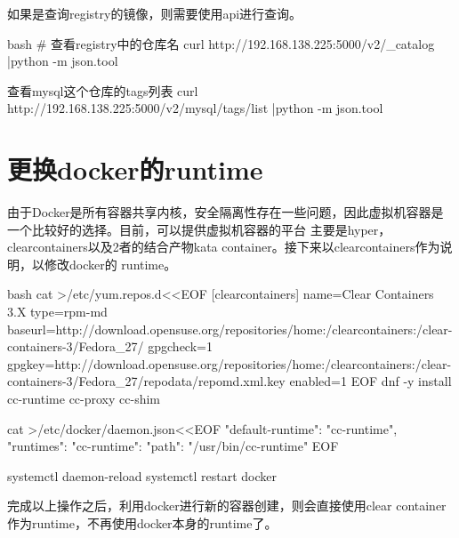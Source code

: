 如果是查询registry的镜像，则需要使用api进行查询。
\begin{code-block}{bash}
# 查看registry中的仓库名
curl http://192.168.138.225:5000/v2/_catalog |python -m json.tool

查看mysql这个仓库的tags列表
curl http://192.168.138.225:5000/v2/mysql/tags/list |python -m json.tool
\end{code-block}

\section{更换docker的runtime}
由于Docker是所有容器共享内核，安全隔离性存在一些问题，因此虚拟机容器是一个比较好的选择。目前，可以提供虚拟机容器的平台
主要是hyper，clearcontainers以及2者的结合产物kata container。接下来以clearcontainers作为说明，以修改docker的
runtime。
\begin{code-block}{bash}
cat >/etc/yum.repos.d<<EOF
[clearcontainers]
name=Clear Containers 3.X
type=rpm-md
baseurl=http://download.opensuse.org/repositories/home:/clearcontainers:/clear-containers-3/Fedora_27/
gpgcheck=1
gpgkey=http://download.opensuse.org/repositories/home:/clearcontainers:/clear-containers-3/Fedora_27/repodata/repomd.xml.key
enabled=1
EOF
dnf -y install cc-runtime cc-proxy cc-shim

cat >/etc/docker/daemon.json<<EOF
{
    "default-runtime": "cc-runtime",
    "runtimes": {
        "cc-runtime": {
            "path": "/usr/bin/cc-runtime"
        }
    }
}
EOF

systemctl daemon-reload
systemctl restart docker
\end{code-block}
完成以上操作之后，利用docker进行新的容器创建，则会直接使用clear container作为runtime，不再使用docker本身的runtime了。